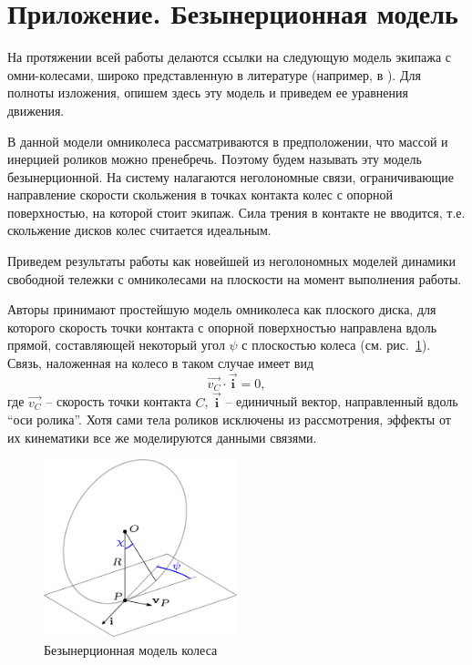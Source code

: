\section*{Приложение. Безынерционная модель}\label{sect:bezinerz}

На протяжении всей работы делаются ссылки на следующую модель экипажа с омни-колесами, широко представленную в литературе (например, в \cite{Borisov2011, formalskii, ZobovaTatarinovPMM}). Для полноты изложения, опишем здесь эту модель и приведем ее уравнения движения.

В данной модели омниколеса рассматриваются в предположении, что массой и инерцией роликов можно пренебречь. Поэтому будем называть эту модель безынерционной. На систему налагаются неголономные связи, ограничивающие направление скорости скольжения в точках контакта колес с опорной поверхностью, на которой стоит экипаж. Сила трения в контакте не вводится, т.е. скольжение дисков колес считается идеальным.

Приведем результаты работы \cite{Borisov2011} как новейшей из неголономных моделей динамики свободной тележки с омниколесами на плоскости на момент выполнения работы.

Авторы \cite{Borisov2011} принимают простейшую модель омниколеса как плоского диска, для которого скорость точки контакта с опорной поверхностью направлена вдоль прямой, составляющей некоторый угол $\psi$ с плоскостью колеса (см. рис.~\ref{fig:bor_wheel_scheme}). Связь, наложенная на колесо в таком случае имеет вид
$$\vec{v_C}\cdot\vec{\mathbf{i}} = 0,$$
где $\vec{v_C}$ -- скорость точки контакта $C$, $\vec{\mathbf{i}}$ -- единичный вектор, направленный вдоль ``оси ролика''. Хотя сами тела роликов исключены из рассмотрения, эффекты от их кинематики все же моделируются данными связями.\\

\begin{figure}[ht!]
    \centering
    \includegraphics[width=0.5\textwidth]{content/pic/asy/wheel_bor.png}
    \caption{Безынерционная модель колеса}
    \label{fig:bor_wheel_scheme}
\end{figure}

